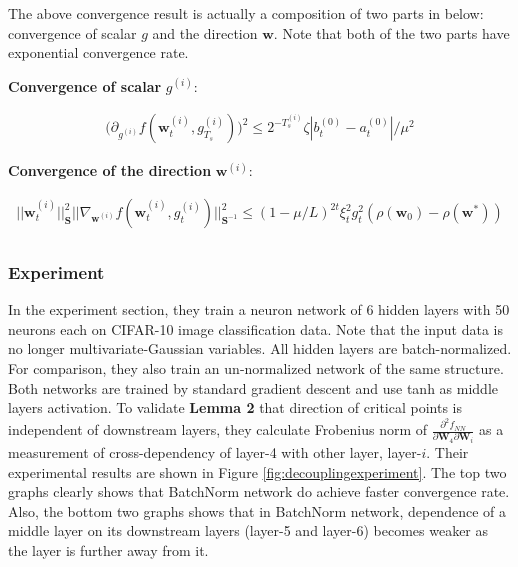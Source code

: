 \documentclass{article}
\begin{document}

The above convergence result is actually a composition of two parts in below: convergence of scalar $g$ and the direction $\textbf{w}$. Note that both of the two parts have exponential convergence rate.

\textbf{Convergence of scalar} $g^{(i)}$:

\begin{align*}
    \Big(\partial_{g^{(i)}}f(\textbf{w}_t^{(i)},g^{(i)}_{T_s})\Big)^2\leq2^{-T_s^{(i)}}\zeta|b_t^{(0)}-a_t^{(0)}|/\mu^2
\end{align*}

\textbf{Convergence of the direction} $\textbf{w}^{(i)}$:

\begin{align*}
    ||\textbf{w}_t^{(i)}||^2_{\textbf{S}}||\nabla_{\textbf{w}^{(i)}}f(\textbf{w}_t^{(i)},g_t^{(i)})||^2_{\textbf{S}^{-1}}\leq (1-\mu/L)^{2t}\xi_t^{2}g_t^{2}(\rho(\textbf{w}_0)-\rho(\textbf{w}^*))\\
\end{align*}

\subsubsection{Experiment}

In the experiment section, they train a neuron network of 6 hidden layers with 50 neurons each on CIFAR-10 image classification data. Note that the input data is no longer multivariate-Gaussian variables. All hidden layers are batch-normalized. For comparison, they also train an un-normalized network of the same structure. Both networks are trained by standard gradient descent and use tanh as middle layers activation. To validate \textbf{Lemma 2} that direction of critical points is independent of downstream layers, they calculate Frobenius norm of $\frac{\partial^2f_{NN}}{\partial\textbf{W}_4\partial\textbf{W}_i}$ as a measurement of cross-dependency of layer-4 with other layer, layer-$i$. Their experimental results are shown in Figure \ref{fig:decouplingexperiment}. The top two graphs clearly shows that BatchNorm network do achieve faster convergence rate. Also, the bottom two graphs shows that in BatchNorm network, dependence of a middle layer on its downstream layers (layer-5 and layer-6) becomes weaker as the layer is further away from it.
\end{document}

